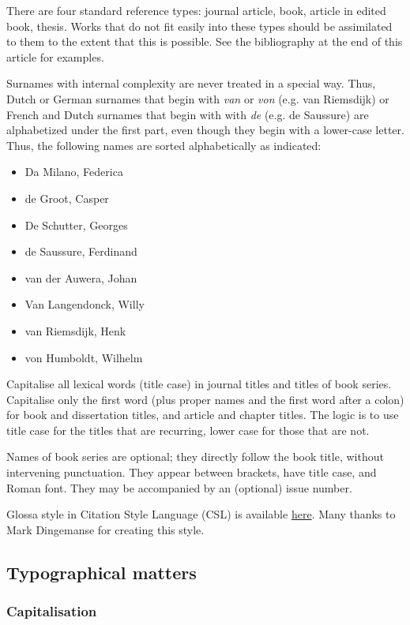 \documentclass[charis,linguex]{glossa}
\begin{document}
There are four standard reference types: journal article, book, article in edited book, thesis. Works that do not fit easily into these types should be assimilated to them to the extent that this is possible. See the bibliography at the end of this article for examples.

Surnames with internal complexity are never treated in a special way. Thus, Dutch or German surnames that begin with \textit{van} or \textit{von} (e.g. van Riemsdijk) or French and Dutch surnames that begin with with \textit{de} (e.g. de Saussure) are alphabetized under the first part, even though they begin with a lower-case letter. Thus, the following names are sorted alphabetically as indicated:

\begin{itemize}
\item Da Milano, Federica
\item de Groot, Casper
\item De Schutter, Georges
\item de Saussure, Ferdinand
\item van der Auwera, Johan
\item Van Langendonck, Willy
\item van Riemsdijk, Henk
\item von Humboldt, Wilhelm
\end{itemize}

Capitalise all lexical words (title case) in journal titles and titles of book series. Capitalise only the first word (plus proper names and the first word after a colon) for book and dissertation titles, and article and chapter titles. The logic is to use title case for the titles that are recurring, lower case for those that are not.

Names of book series are optional; they directly follow the book title, without intervening punctuation. They appear between brackets, have title case, and Roman font. They may be accompanied by an (optional) issue number.

Glossa style in Citation Style Language (CSL) is available \href{https://www.zotero.org/styles?q=Glossa}{here}. Many thanks to Mark Dingemanse for creating this style.


\subsection{Typographical matters}

\subsubsection{Capitalisation}
\end{document}
